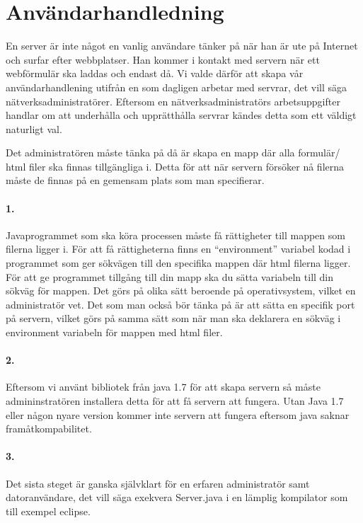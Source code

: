 \section{Användarhandledning}
En server är inte något en vanlig användare tänker på när han är ute på Internet och surfar efter webbplatser. Han kommer i kontakt med servern när ett webförmulär ska laddas och endast då.
Vi valde därför att skapa vår användarhandlening utifrån en som dagligen arbetar med servrar, det vill säga nätverksadministratörer. 
Eftersom en nätverksadministratörs arbetsuppgifter handlar om att underhålla och upprätthålla servrar kändes detta som ett väldigt naturligt val.

Det administratören måste tänka på då är skapa en mapp där alla formulär/ html filer ska finnas tillgängliga i. Detta för att när servern försöker nå filerna måste de finnas på en gemensam plats som man specifierar.


\paragraph{1.}
Javaprogrammet som ska köra processen måste få rättigheter till mappen som filerna ligger i. För att få rättigheterna finns en “environment” variabel kodad i programmet som ger sökvägen till den specifika mappen där html filerna ligger. För att ge programmet tillgång till din mapp ska du sätta variabeln till din sökväg för mappen. Det görs på olika sätt beroende på operativsystem, vilket en administratör vet.  
Det som man också bör tänka på är att sätta en specifik port på servern, vilket görs på samma sätt som när man ska deklarera en sökväg i environment variabeln för mappen med html filer.

\paragraph{2.}
Eftersom vi använt bibliotek från java 1.7 för att skapa servern så måste admininstratören installera detta för att få servern att fungera. Utan Java 1.7 eller någon nyare version kommer inte servern att fungera eftersom java saknar framåtkompabilitet. 

\paragraph{3.}
Det sista steget är ganska självklart för en erfaren administratör samt datoranvändare, det vill säga exekvera Server.java i en lämplig kompilator som till exempel eclipse. 
